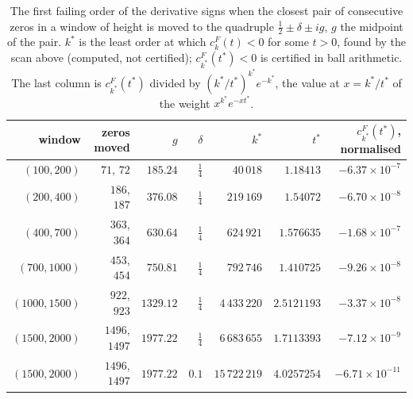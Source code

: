 \begin{table}[htbp]
\centering\small\setlength{\tabcolsep}{4pt}
\begin{tabular}{rrrrrrr}
\toprule
window & zeros moved & $g$ & $\delta$ & $k^*$ & $t^*$ & $c_{k^*}^F(t^*)$, normalised\\
\midrule
$(100,200)$ & $71$, $72$ & $185.24$ & $\frac14$ & $40\,018$ & $1.18413$ & $-6.37\times10^{-7}$\\
$(200,400)$ & $186$, $187$ & $376.08$ & $\frac14$ & $219\,169$ & $1.54072$ & $-6.70\times10^{-8}$\\
$(400,700)$ & $363$, $364$ & $630.64$ & $\frac14$ & $624\,921$ & $1.576635$ & $-1.68\times10^{-7}$\\
$(700,1000)$ & $453$, $454$ & $750.81$ & $\frac14$ & $792\,746$ & $1.410725$ & $-9.26\times10^{-8}$\\
$(1000,1500)$ & $922$, $923$ & $1329.12$ & $\frac14$ & $4\,433\,220$ & $2.5121193$ & $-3.37\times10^{-8}$\\
$(1500,2000)$ & $1496$, $1497$ & $1977.22$ & $\frac14$ & $6\,683\,655$ & $1.7113393$ & $-7.12\times10^{-9}$\\
$(1500,2000)$ & $1496$, $1497$ & $1977.22$ & $0.1$ & $15\,722\,219$ & $4.0257254$ & $-6.71\times10^{-11}$\\
\bottomrule
\end{tabular}
\caption{The first failing order of the derivative signs when the closest pair of consecutive zeros in a window of height is moved to the quadruple $\frac12\pm\delta\pm ig$, $g$ the midpoint of the pair. $k^*$ is the least order at which $c_k^F(t)<0$ for some $t>0$, found by the scan above (computed, not certified); $c_{k^*}^F(t^*)<0$ is certified in ball arithmetic. The last column is $c_{k^*}^F(t^*)$ divided by $(k^*/t^*)^{k^*}e^{-k^*}$, the value at $x=k^*/t^*$ of the weight $x^{k^*}e^{-xt^*}$.}
\label{tab:ch13:first}
\end{table}

